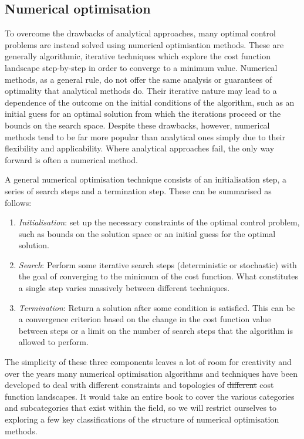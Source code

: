 \documentclass[a4paper,oneside,11pt]{book}
\providecommand{\DIFaddtex}[1]{{\protect\color{blue}\uwave{#1}}} %
\providecommand{\DIFdeltex}[1]{{\protect\color{red}\sout{#1}}}                      %
\providecommand{\DIFaddbegin}{} %
\providecommand{\DIFaddend}{} %
\providecommand{\DIFdelbegin}{} %
\providecommand{\DIFdelend}{} %
\providecommand{\DIFadd}[1]{\texorpdfstring{\DIFaddtex{#1}}{#1}} %
\providecommand{\DIFdel}[1]{\texorpdfstring{\DIFdeltex{#1}}{}} %
\newcommand{\DIFscaledelfig}{0.5}
\newlength{\DIFdelgraphicswidth} %
\newlength{\DIFdelgraphicsheight} %
\newcommand{\DIFaddincludegraphics}[2][]{{\color{blue}\fbox{\DIFOincludegraphics[#1]{#2}}}} %
\newcommand{\DIFdelincludegraphics}[2][]{%
\sbox{\DIFdelgraphicsbox}{\DIFOincludegraphics[#1]{#2}}%
\settoboxwidth{\DIFdelgraphicswidth}{\DIFdelgraphicsbox} %
\settoboxtotalheight{\DIFdelgraphicsheight}{\DIFdelgraphicsbox} %
\scalebox{\DIFscaledelfig}{%
\parbox[b]{\DIFdelgraphicswidth}{\usebox{\DIFdelgraphicsbox}\\[-\baselineskip] \rule{\DIFdelgraphicswidth}{0em}}\llap{\resizebox{\DIFdelgraphicswidth}{\DIFdelgraphicsheight}{%
\setlength{\unitlength}{\DIFdelgraphicswidth}%
\begin{picture}(1,1)%
\thicklines\linethickness{2pt} %
{\color[rgb]{1,0,0}\put(0,0){\framebox(1,1){}}}%
{\color[rgb]{1,0,0}\put(0,0){\line( 1,1){1}}}%
{\color[rgb]{1,0,0}\put(0,1){\line(1,-1){1}}}%
\end{picture}%
}\hspace*{3pt}}} %
} %
\DeclareRobustCommand{\DIFaddbegin}{\DIFOaddbegin \let\includegraphics\DIFaddincludegraphics} %
\DeclareRobustCommand{\DIFaddend}{\DIFOaddend \let\includegraphics\DIFOincludegraphics} %
\DeclareRobustCommand{\DIFdelbegin}{\DIFOdelbegin \let\includegraphics\DIFdelincludegraphics} %
\DeclareRobustCommand{\DIFdelend}{\DIFOaddend \let\includegraphics\DIFOincludegraphics} %
\begin{document}
\subsection{Numerical optimisation}\label{sec:3.1.3_numerical_optimisation}

To overcome the drawbacks of analytical approaches, many optimal control problems are instead solved using numerical optimisation methods. These are generally algorithmic, iterative  techniques which explore the cost function landscape step-by-step in order to converge to a minimum value. Numerical methods, as a general rule, do not offer the same analysis or guarantees of optimality that analytical methods do. Their iterative nature may lead to a dependence of the outcome on the initial conditions of the algorithm, such as an initial guess for an optimal solution from which the iterations proceed or the bounds on the search space. Despite these drawbacks, however, numerical methods tend to be far more popular than analytical ones simply due to their flexibility and applicability. Where analytical approaches fail, the only way forward is often a numerical method.

A general numerical optimisation technique consists of an initialisation step, a series of search steps and a termination step. These can be summarised as follows:
\begin{enumerate}
    \item \emph{Initialisation}: set up the necessary constraints of the optimal control problem, such as bounds on the solution space or an initial guess for the optimal solution.
    \item \emph{Search}: Perform some iterative search steps (deterministic or stochastic) with the goal of converging to the minimum of the cost function. What constitutes a single step varies massively between different techniques.
    \item \emph{Termination}: Return a solution after some condition is satisfied. This can be a convergence criterion based on the change in the cost function value between steps or a limit on the number of search steps that the algorithm is allowed to perform.
\end{enumerate}

The simplicity of these three components leaves a lot of room for creativity and over the years many numerical optimisation algorithms and techniques have been developed to deal with different constraints and topologies of \DIFdelbegin \DIFdel{different }\DIFdelend \DIFaddbegin \DIFadd{various }\DIFaddend cost function landscapes. It would take an entire book \cite{nocedal_numerical_2006} to cover the various categories and subcategories that exist within the field, so we will restrict ourselves to exploring a few key classifications of the structure of numerical optimisation methods. 
\end{document}
